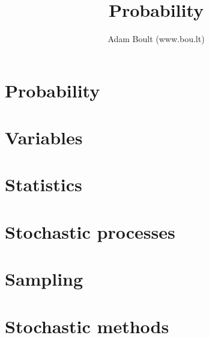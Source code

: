 \documentclass[oneside]{book}
\begin{document}
\author{Adam Boult (www.bou.lt)}
\title{Probability}
\maketitle

\setcounter{tocdepth}{0}
\tableofcontents



\part{Probability}




\part{Variables}









\part{Statistics}












\part{Stochastic processes}









\part{Sampling}




\part{Stochastic methods}




\end{document}
